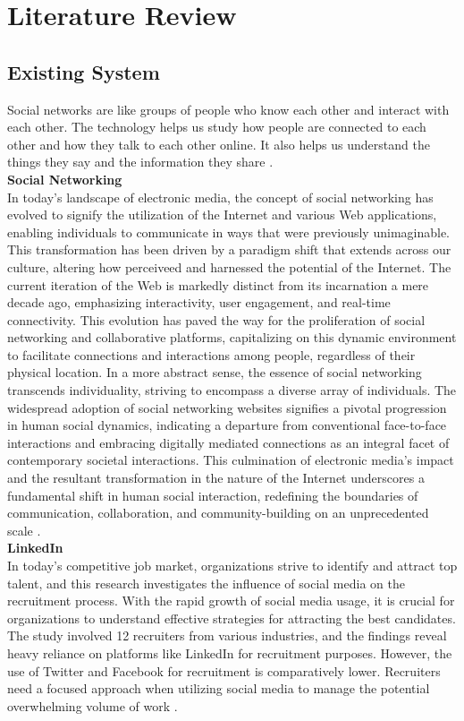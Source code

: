 \section{Literature Review}
\subsection{Existing System}
Social networks are like groups of people who know each other and interact with each other. The technology helps us study how people are connected to each other and how they talk to each other online. It also helps us understand the things they say and the information they share \cite{korshunov2014social}.\\
\textbf{Social Networking}\\
In today's landscape of electronic media, the concept of social networking has evolved to signify the utilization of the Internet and various Web applications, enabling individuals to communicate in ways that were previously unimaginable. This transformation has been driven by a paradigm shift that extends across our culture, altering how perceiveed and harnessed the potential of the Internet. The current iteration of the Web is markedly distinct from its incarnation a mere decade ago, emphasizing interactivity, user engagement, and real-time connectivity. This evolution has paved the way for the proliferation of social networking and collaborative platforms, capitalizing on this dynamic environment to facilitate connections and interactions among people, regardless of their physical location. In a more abstract sense, the essence of social networking transcends individuality, striving to encompass a diverse array of individuals. The widespread adoption of social networking websites signifies a pivotal progression in human social dynamics, indicating a departure from conventional face-to-face interactions and embracing digitally mediated connections as an integral facet of contemporary societal interactions. This culmination of electronic media's impact and the resultant transformation in the nature of the Internet underscores a fundamental shift in human social interaction, redefining the boundaries of communication, collaboration, and community-building on an unprecedented scale \cite{weaver2008social}.
\\
\textbf{LinkedIn}\\
In today's competitive job market, organizations strive to identify and attract top talent, and this research investigates the influence of social media on the recruitment process. With the rapid growth of social media usage, it is crucial for organizations to understand effective strategies for attracting the best candidates. The study involved 12 recruiters from various industries, and the findings reveal heavy reliance on platforms like LinkedIn for recruitment purposes. However, the use of Twitter and Facebook for recruitment is comparatively lower. Recruiters need a focused approach when utilizing social media to manage the potential overwhelming volume of work \cite{koch2018impact}.\\
